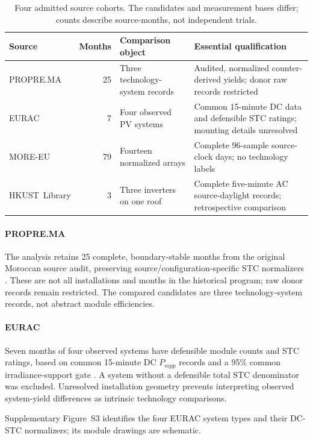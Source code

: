 \documentclass[preprint,12pt]{elsarticle}
\begin{document}
\begin{table}[H]
\centering
\caption{Four admitted source cohorts. The candidates and measurement bases differ; counts describe source-months, not independent trials.}
\label{tab:data}
\small
\begin{tabular}{@{}L{2.85cm}rL{3.45cm}L{4.45cm}@{}}
\toprule
Source & Months & Comparison object & Essential qualification \\
\midrule
PROPRE.MA & 25 & Three technology-system records & Audited, normalized counter-derived yields; donor raw records restricted \\
EURAC & 7 & Four observed PV systems & Common 15-minute DC data and defensible STC ratings; mounting details unresolved \\
MORE-EU & 79 & Fourteen normalized arrays & Complete 96-sample source-clock days; no technology labels \\
\mbox{HKUST Library} & 3 & Three inverters on one roof & Complete five-minute AC source-daylight records; retrospective comparison \\
\bottomrule
\end{tabular}
\end{table}

\paragraph{PROPRE.MA} The analysis retains 25 complete, boundary-stable months from the original Moroccan source audit, preserving source/configuration-specific STC normalizers \cite{bennouna2019}. These are not all installations and months in the historical program; raw donor records remain restricted. The compared candidates are three technology-system records, not abstract module efficiencies.

\paragraph{EURAC} Seven months of four observed systems have defensible module counts and STC ratings, based on common 15-minute DC $P_{mpp}$ records and a 95\% common irradiance-support gate \cite{eurac2026}. A system without a defensible total STC denominator was excluded. Unresolved installation geometry prevents interpreting observed system-yield differences as intrinsic technology comparisons.

Supplementary Figure~S3 identifies the four EURAC system types and their DC-STC normalizers; its module drawings are schematic.
\end{document}
